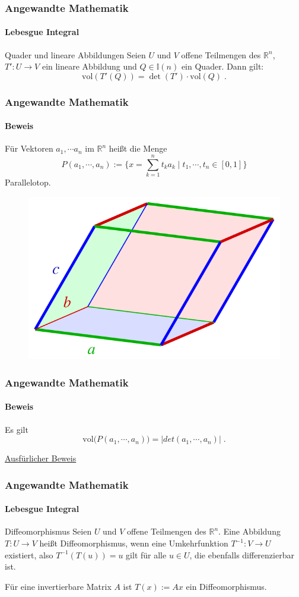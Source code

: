 \documentclass{beamer}
\begin{document}
\begin{frame}
    \frametitle{Angewandte Mathematik}
\framesubtitle{Lebesgue Integral}
\begin{block}{Quader und lineare Abbildungen}
Seien $U$ und $V$ offene Teilmengen des $\mathbb{R}^n$, $T': U \to V$ ein lineare Abbildung und  $Q \in \mathbb{I}(n)$ ein Quader.
Dann gilt:
 $$ \text{vol}  (T'(Q))   =  \det (T') \cdot   \text{vol}(Q) \; .$$
\end{block}
 \end{frame}

\begin{frame}
    \frametitle{Angewandte Mathematik}
\framesubtitle{Beweis}
Für Vektoren $a_1, \cdots a_n$ im $\mathbb{R}^n$ heißt die Menge 
$$ P(a_1, \cdots,  a_n) := \biggl \{  x = \sum_{k=1}^n t_k a_k  \; | \; t_1, \cdots , t_n \in [0,1]  \biggr \}$$
Parallelotop.
\begin{figure}[H]
      \centering
    \includegraphics[width=0.6 \textwidth]{images/640px-Parallelepiped-0}    
\end{figure}
 \end{frame}

\begin{frame}
    \frametitle{Angewandte Mathematik}
\framesubtitle{Beweis}

Es gilt  $$  \text{vol} \bigr( P(a_1, \cdots, a_n) \bigr) =  | det (a_1, \cdots, a_n) |   \; .$$

\href{https://www.math.uchicago.edu/~may/VIGRE/VIGRE2007/REUPapers/FINALAPP/Peng.pdf}{Ausfürlicher Beweis}
 \end{frame}



\begin{frame}
    \frametitle{Angewandte Mathematik}
\framesubtitle{Lebesgue Integral}
\begin{block}{Diffeomorphismus}
Seien $U$ und $V$ offene Teilmengen des $\mathbb{R}^n$. Eine Abbildung  $T: U \to V$ heißt Diffeomorphismus, wenn eine  Umkehrfunktion $T^{-1}: V  \to U$ existiert, also $T^{-1} (T (u)) = u$ gilt für alle $u \in U$, die ebenfalls differenzierbar ist.
\end{block}

\begin{block}{}
Für eine invertierbare Matrix $A$ ist $T(x):= Ax$ ein Diffeomorphismus.
\end{block}
 \end{frame}
\end{document}

